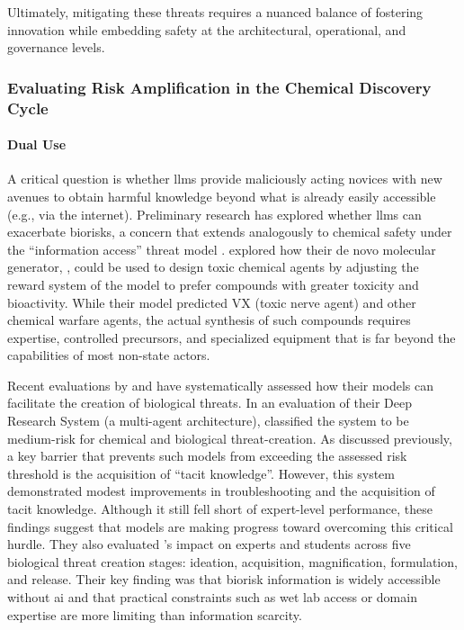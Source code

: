 Ultimately, mitigating these threats requires a nuanced balance of fostering innovation while embedding safety at the architectural, operational, and governance levels.

\subsubsection{Evaluating Risk Amplification in the Chemical Discovery Cycle}

\paragraph{Dual Use} A critical question is whether \glspl{llm} provide maliciously acting novices with new avenues to obtain harmful knowledge beyond what is already easily accessible (e.g., via the internet)\autocite{sandbrink2023artificial}. 
Preliminary research has explored whether \glspl{llm} can exacerbate biorisks, a concern that extends analogously to chemical safety under the \enquote{information access} threat model \autocite{peppin2024reality}. \textcite{urbina2022dual} explored how their de novo molecular generator, , could be used to design toxic chemical agents by adjusting the reward system of the model to prefer compounds with greater toxicity and bioactivity. 
While their model predicted VX (toxic nerve agent) and other chemical warfare agents, the actual synthesis of such compounds requires expertise, controlled precursors, and specialized equipment that is far beyond the capabilities of most non-state actors.

Recent evaluations by  and  have systematically assessed how their models can facilitate the creation of biological threats. 
In an evaluation of their Deep Research System (a multi-agent architecture),  classified the system to be medium-risk for chemical and biological threat-creation. \autocite{openai2024building} 
As discussed previously, a key barrier that prevents such models from exceeding the assessed risk threshold is the acquisition of \enquote{tacit knowledge}. 
However, this system demonstrated modest improvements in troubleshooting and the acquisition of tacit knowledge. 
Although it still fell short of expert-level performance, these findings suggest that models are making progress toward overcoming this critical hurdle.
They also evaluated 's impact on experts and students across five biological threat creation stages: ideation, acquisition, magnification, formulation, and release. \autocite{openai2024building} 
Their key finding was that biorisk information is widely accessible without \gls{ai} and that practical constraints such as wet lab access or domain expertise are more limiting than information scarcity. 

